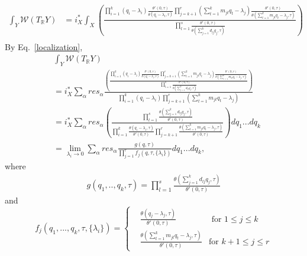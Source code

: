\documentclass[11pt]{article}
\newcommand{\reals}{\mathbb R}
\begin{document}
\begin{equation*}
\begin{aligned}
\int_{Y} \mathcal{W}(T_\reals Y) 
& =i_X^*\int_X \left(\frac{\prod_{i=1}^k (q_i-\lambda_i) \frac{\theta'(0,\tau)}{\theta(q_i-\lambda_i,\tau)}\prod_{j=k+1}^r (\sum_{t=1}^k m_{jt}q_t-\lambda_j) \frac{\theta'(0,\tau)}{\theta(\sum_{t=1}^k m_{jt}q_t-\lambda_j,\tau)}}{\prod_{l=1}^s \frac{\theta'(0,\tau)}{\theta(\sum_{j=1}^k d_{l j} q_j,\tau)}}\right)\\
\end{aligned}
\end{equation*}
By Eq.~\ref{localization},
\begin{equation*}
\begin{aligned}
&\int_{Y} \mathcal{W}(T_\reals Y) \\
& =i_X^*\sum_\alpha res_\alpha \frac{\left(\frac{\prod_{i=1}^k (q_i-\lambda_i) \frac{\theta'(0,\tau)}{\theta(q_i-\lambda_i,\tau)}\prod_{j=k+1}^r (\sum_{t=1}^k m_{jt}q_t-\lambda_j) \frac{\theta'(0,\tau)}{\theta(\sum_{t=1}^k m_{jt}q_t-\lambda_j,\tau)}}{\prod_{l=1}^s \frac{\theta'(0,\tau)}{\theta(\sum_{j=1}^k d_{l j} q_j,\tau)}}\right)}{\prod_{i=1}^k (q_i-\lambda_i)\prod_{j=k+1}^r (\sum_{t=1}^k m_{jt}q_t-\lambda_j)}\\
& =i_X^*\sum_\alpha res_\alpha\left(\frac{\prod_{l=1}^s \frac{\theta(\sum_{j=1}^k d_{l j} q_j,\tau)}{\theta'(0,\tau)}}{\prod_{i=1}^k  \frac{\theta(q_i-\lambda_i,\tau)}{\theta'(0,\tau)}\prod_{j=k+1}^r  \frac{\theta(\sum_{t=1}^k m_{jt}q_t-\lambda_j,\tau)}{\theta'(0,\tau)}}\right)dq_1...dq_k\\
&=\lim_{\lambda_i\rightarrow0}\sum_\alpha res_\alpha \frac{g(q,\tau)}{\prod_{j=1}^r f_j (q,\tau,\{\lambda_i\})}dq_1...dq_k,
\end{aligned}
\end{equation*}
where
\begin{equation*}
\begin{aligned}
g(q_1,..,q_k,\tau)=\prod_{l=1}^s\frac{\theta(\sum_{j=1}^k d_{l j} q_j,\tau)}{\theta'(0,\tau)}
\end{aligned}
\end{equation*}
and
\begin{equation*}
f_j(q_1,...,q_k,\tau,\{\lambda_i\})=\left\{
\begin{aligned}
&\frac{\theta(q_j-\lambda_j,\tau)}{\theta'(0,\tau)} & \text{ for } 1\leq j\leq k\\
& \frac{\theta(\sum_{t=1}^k m_{jt}q_t-\lambda_j,\tau)}{\theta'(0,\tau)} &\text{for } k+1\leq j\leq r
\end{aligned}
 \right.
\end{equation*}
\end{document}
